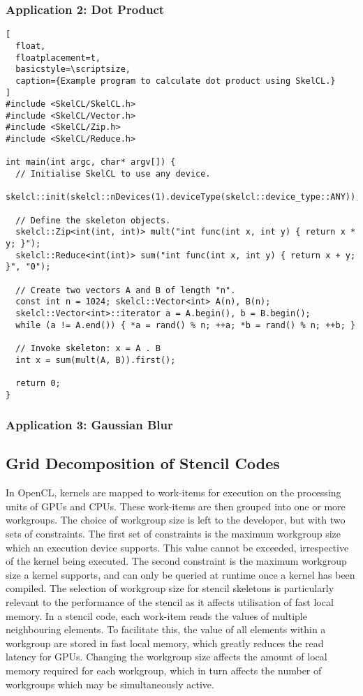 \subsubsection{Application 2: Dot Product}


\lstset{language=C++}
\begin{lstlisting}[
  float,
  floatplacement=t,
  basicstyle=\scriptsize,
  caption={Example program to calculate dot product using SkelCL.}
]
#include <SkelCL/SkelCL.h>
#include <SkelCL/Vector.h>
#include <SkelCL/Zip.h>
#include <SkelCL/Reduce.h>

int main(int argc, char* argv[]) {
  // Initialise SkelCL to use any device.
  skelcl::init(skelcl::nDevices(1).deviceType(skelcl::device_type::ANY));

  // Define the skeleton objects.
  skelcl::Zip<int(int, int)> mult("int func(int x, int y) { return x * y; }");
  skelcl::Reduce<int(int)> sum("int func(int x, int y) { return x + y; }", "0");

  // Create two vectors A and B of length "n".
  const int n = 1024; skelcl::Vector<int> A(n), B(n);
  skelcl::Vector<int>::iterator a = A.begin(), b = B.begin();
  while (a != A.end()) { *a = rand() % n; ++a; *b = rand() % n; ++b; }

  // Invoke skeleton: x = A . B
  int x = sum(mult(A, B)).first();

  return 0;
}
\end{lstlisting}

\subsubsection{Application 3: Gaussian Blur}


\subsection{Grid Decomposition of Stencil Codes}

In OpenCL, kernels are mapped to work-items for execution on the
processing units of GPUs and CPUs. These work-items are then grouped
into one or more workgroups. The choice of workgroup size is left to
the developer, but with two sets of constraints. The first set of
constraints is the maximum workgroup size which an execution device
supports. This value cannot be exceeded, irrespective of the kernel
being executed. The second constraint is the maximum workgroup size a
kernel supports, and can only be queried at runtime once a kernel has
been compiled. The selection of workgroup size for stencil skeletons
is particularly relevant to the performance of the stencil as it
affects utilisation of fast local memory. In a stencil code, each
work-item reads the values of multiple neighbouring elements. To
facilitate this, the value of all elements within a workgroup are
stored in fast local memory, which greatly reduces the read latency
for GPUs. Changing the workgroup size affects the amount of local
memory required for each workgroup, which in turn affects the number
of workgroups which may be simultaneously active.

